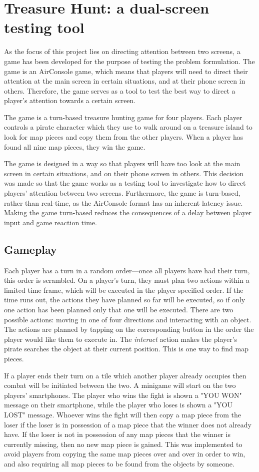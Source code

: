 \chapter{Treasure Hunt: a dual-screen testing tool}\label{ch:game}
As the focus of this project lies on directing attention between two screens, a game has been developed for the purpose of testing the problem formulation. The game is an AirConsole game, which means that players will need to direct their attention at the main screen in certain situations, and at their phone screen in others. Therefore, the game serves as a tool to test the best way to direct a player's attention towards a certain screen.

The game is a turn-based treasure hunting game for four players. Each player controls a pirate character which they use to walk around on a treasure island to look for map pieces and copy them from the other players. When a player has found all nine map pieces, they win the game.

The game is designed in a way so that players will have too look at the main screen in certain situations, and on their phone screen in others. This decision was made so that the game works as a testing tool to investigate how to direct players' attention between two screens. Furthermore, the game is turn-based, rather than real-time, as the AirConsole format has an inherent latency issue. Making the game turn-based reduces the consequences of a delay between player input and game reaction time.

\section{Gameplay}
Each player has a turn in a random order---once all players have had their turn, this order is scrambled. On a player's turn, they must plan two actions within a limited time frame, which will be executed in the player specified order. If the time runs out, the actions they have planned so far will be executed, so if only one action has been planned only that one will be executed. There are two possible actions: moving in one of four directions and interacting with an object. The actions are planned by tapping on the corresponding button in the order the player would like them to execute in. The \textit{interact} action makes the player's pirate searches the object at their current position. This is one way to find map pieces. 

If a player ends their turn on a tile which another player already occupies then combat will be initiated between the two. A minigame will start on the two players' smartphones. The player who wins the fight is shown a "YOU WON" message on their smartphone, while the player who loses is shown a "YOU LOST" message. Whoever wins the fight will then copy a map piece from the loser if the loser is in possession of a map piece that the winner does not already have. If the loser is not in possession of any map pieces that the winner is currently missing, then no new map piece is gained. This was implemented to avoid players from copying the same map pieces over and over in order to win, and also requiring all map pieces to be found from the objects by someone.


